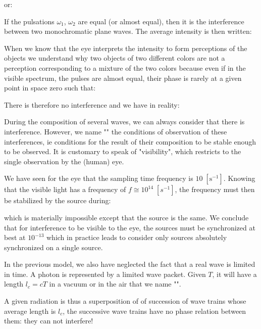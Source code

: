 	or:
	
	If the pulsations $\omega_1$, $\omega_2$ are equal (or almost equal), then it is the interference between two monochromatic plane waves. The average intensity is then written:
	
	When we know that the eye interprets the intensity to form perceptions of the objects we understand why two objects of two different colors are not a perception corresponding to a mixture of the two colors because even if in the visible spectrum, the pulses are almost equal, their phase is rarely at a given point in space zero such that:
	
	There is therefore no interference and we have in reality:
	
	\begin{tcolorbox}[title=Remark,colframe=black,arc=10pt]
	During the composition of several waves, we can always consider that there is interference. However, we name "" the conditions of observation of these interferences, ie conditions for the result of their composition to be stable enough to be observed. It is customary to speak of "visibility", which restricts to the single observation by the (human) eye.
	\end{tcolorbox}
	We have seen for the eye that the sampling time frequency is $10\;[\text{s}^{-1}]$. Knowing that the visible light has a frequency of $f\cong 10^{14}\;[s^{-1}]$, the frequency must then be stabilized by the source during:
	
	which is materially impossible except that the source is the same. We conclude that for interference to be visible to the eye, the sources must be synchronized at best at $10^{-13}$ which in practice leads to consider only sources absolutely synchronized on a single source.

	In the previous model, we also have neglected the fact that a real wave is limited in time. A photon is represented by a limited wave packet. Given $T$, it will have a length $l_c=cT$ in a vacuum or in the air that we name "".

	A given radiation is thus a superposition of of succession of wave trains whose average length is $l_c$, the successive wave trains have no phase relation between them: they can not interfere!
	
	\pagebreak
